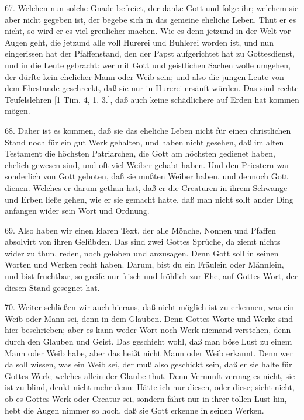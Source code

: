 67. Welchen nun solche Gnade befreiet, der danke Gott und folge ihr; welchem sie aber nicht gegeben ist, der begebe sich in das gemeine eheliche Leben. Thut er es nicht, so wird er es viel greulicher machen. Wie es denn jetzund in der Welt vor Augen geht, die jetzund alle voll Hurerei und Buhlerei worden ist, und nun eingerissen hat der Pfaffenstand, den der Papst aufgerichtet hat zu Gottesdienst, und in die Leute gebracht: wer mit Gott und geistlichen Sachen wolle umgehen, der dürfte kein ehelicher Mann oder Weib sein; und also die jungen Leute von dem Ehestande geschreckt, daß sie nur in Hurerei ersäuft würden. Das sind rechte Teufelslehren [1 Tim. 4, 1. 3.], daß auch keine schädlichere auf Erden hat kommen mögen.

68. Daher ist es kommen, daß sie das eheliche Leben nicht für einen christlichen Stand noch für ein gut Werk gehalten, und haben nicht gesehen, daß im alten Testament die höchsten Patriarchen, die Gott am höchsten gedienet haben, ehelich gewesen sind, und oft viel Weiber gehabt haben. Und den Priestern war sonderlich von Gott geboten, daß sie mußten Weiber haben, und dennoch Gott dienen. Welches er darum gethan hat, daß er die Creaturen in ihrem Schwange und Erben ließe gehen, wie er sie gemacht hatte, daß man nicht sollt ander Ding anfangen wider sein Wort und Ordnung.

69. Also haben wir einen klaren Text, der alle Mönche, Nonnen und Pfaffen absolvirt von ihren Gelübden. Das sind zwei Gottes Sprüche, da ziemt nichts wider zu thun, reden, noch geloben und anzusagen. Denn Gott soll in seinen Worten und Werken recht haben. Darum, bist du ein Fräulein oder Männlein, und bist fruchtbar, so greife nur frisch und fröhlich zur Ehe, auf Gottes Wort, der diesen Stand gesegnet hat.

70. Weiter schließen wir auch hieraus, daß nicht möglich ist zu erkennen, was ein Weib oder Mann sei, denn in dem Glauben. Denn Gottes Worte und Werke sind hier beschrieben; aber es kann weder Wort noch Werk niemand verstehen, denn durch den Glauben und Geist. Das geschieht wohl, daß man böse Lust zu einem Mann oder Weib habe, aber das heißt nicht Mann oder Weib erkannt. Denn wer da soll wissen, was ein Weib sei, der muß also geschickt sein, daß er sie halte für Gottes Werk; welches allein der Glaube thut. Denn Vernunft vermag es nicht, sie ist zu blind, denkt nicht mehr denn: Hätte ich nur diesen, oder diese; sieht nicht, ob es Gottes Werk oder Creatur sei, sondern fährt nur in ihrer tollen Lust hin, hebt die Augen nimmer so hoch, daß sie Gott erkenne in seinen Werken.

